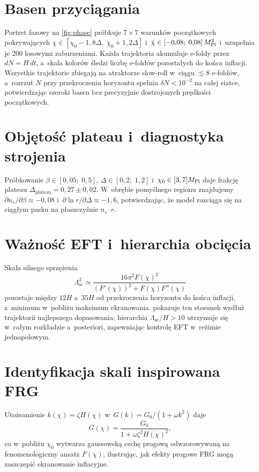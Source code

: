 \documentclass[11pt,a4paper]{article}
\begin{document}
\section{Basen przyciągania}
Portret fazowy na \cref{fig:phase} próbkuje $7\times7$ warunków początkowych pokrywających $\chi\in[\chi_{0}-1{,}8\Delta,\;\chi_{0}+1{,}2\Delta]$ i~$\dot{\chi}\in[-0{,}08;\;0{,}08]\,M_{\rm Pl}^{2}$ i~uzupełnia je 200 losowymi zaburzeniami. Każda trajektoria akumuluje e-foldy przez $dN=H\,dt$, a~skala kolorów śledzi liczbę e-foldów pozostałych do końca inflacji. Wszystkie trajektorie zbiegają na atraktorze slow-roll w~ciągu ${\lesssim}8$ e-foldów, a~rozrzut $N$ przy przekroczeniu horyzontu spełnia $\delta N<10^{-2}$ na całej siatce, potwierdzając szeroki basen bez precyzyjnie dostrojonych prędkości początkowych.

\section{Objętość plateau i~diagnostyka strojenia}
Próbkowanie $\beta\in[0{,}05;\;0{,}5]$, $\Delta\in[0{,}2;\;1{,}2]$ i~$\chi_{0}\in[3,7]M_{\rm Pl}$ daje frakcję plateau $\Delta_{\text{plateau}}=0{,}27\pm0{,}02$. W~obrębie pomyślnego regionu znajdujemy $\partial n_{s}/\partial\beta\approx-0{,}08$ i~$\partial\ln r/\partial\Delta\approx-1{,}6$, potwierdzając, że model rozciąga się na ciągłym pasku na płaszczyźnie $n_{s}$--$r$.

\section{Ważność EFT i~hierarchia obcięcia}
\label{sec:eft}
Skala silnego sprzężenia
\begin{equation}
\Lambda_{\text{sc}}^{2}\simeq \frac{16\pi^{2}F(\chi)^{2}}{\left(F'(\chi)\right)^{2}+F(\chi)F''(\chi)}
\end{equation}
pozostaje między $12H$ a~$35H$ od przekroczenia horyzontu do końca inflacji, z~minimum w~pobliżu maksimum ekranowania.  pokazuje ten stosunek wzdłuż trajektorii najlepszego dopasowania; hierarchia $\Lambda_{\text{sc}}/H>10$ utrzymuje się w~całym rozkładzie a~posteriori, zapewniając kontrolę EFT w~reżimie jednopolowym.

\section{Identyfikacja skali inspirowana FRG}
\label{sec:frg}
Utożsamienie $k(\chi)=\zeta H(\chi)$ w~$G(k)=G_{0}/(1+\omega k^{2})$ daje
\begin{equation}
G(\chi)=\frac{G_{0}}{1+\omega\zeta^{2}H(\chi)^{2}},
\end{equation}
co w~pobliżu $\chi_{0}$ wytwarza gaussowską cechę progową odwzorowywaną na fenomenologiczny ansatz $F(\chi)$, ilustrując, jak efekty progowe FRG mogą zaszczepić ekranowanie inflacyjne.
\end{document}
